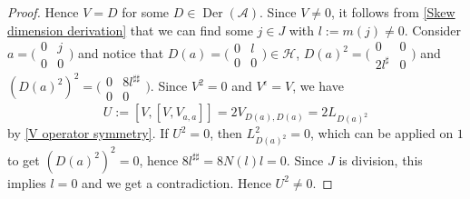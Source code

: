 \documentclass[oneside,a4paper]{amsart} %
\theoremstyle{definition}
\DeclareMathOperator{\Der}{Der}
\newcommand{\A}{\mathcal{A}}
\newcommand{\HH}{\mathcal{H}}
\numberwithin{equation}{section}
\begin{document}
\begin{proof}
	Hence $V=D$ for some $D\in \Der (\A)$.
 	Since $V \neq 0$, it follows from \cref{Skew dimension derivation} that we can find some $j\in J$ with $l:=m(j)\neq 0$.
 	Consider $a=\bigl (\begin{smallmatrix} 0&j\\ 0&0\end{smallmatrix}\bigr )$ and notice that $D(a)=\bigl (\begin{smallmatrix} 0&l\\ 0&0\end{smallmatrix}\bigr ) \in \HH$, $D(a)^2=\bigl (\begin{smallmatrix}0&0\\ 2 l^\sharp &0\end{smallmatrix}\bigr )$ and $(D(a)^2)^2 =\bigl (\begin{smallmatrix} 0&8l^{\sharp \sharp} \\ 0 &0\end{smallmatrix}\bigr )$.
	Since $V^2=0$ and $V^\epsilon = V$, we have
	\[ U:=[V,[V,V_{a,a}]] = 2V_{D(a),D(a)} = 2 L_{D(a)^2} \]
	by \cref{V operator symmetry}.
	If $U^2 = 0$, then $L_{D(a)^2}^2 = 0$, which can be applied on $1$ to get $(D(a)^2)^2 = 0$, hence $8l^{\sharp\sharp} = 8 N(l) l=0$.
	Since $J$ is division, this implies $l=0$ and we get a contradiction. 
	Hence $U^2\neq 0$.
\end{proof}
\end{document}
